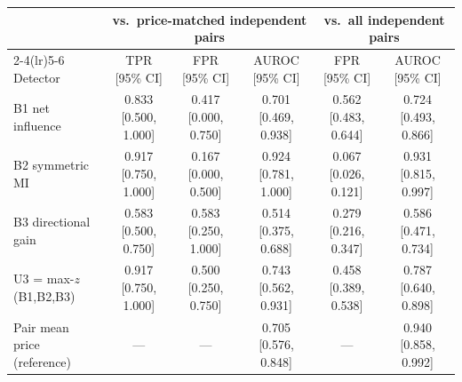 \begin{tabular}{lccccc}
\toprule
 & \multicolumn{3}{c}{vs.\ price-matched independent pairs} & \multicolumn{2}{c}{vs.\ all independent pairs} \\
\cmidrule(lr){2-4}\cmidrule(lr){5-6}
Detector & TPR [95\% CI] & FPR [95\% CI] & AUROC [95\% CI] & FPR [95\% CI] & AUROC [95\% CI] \\
\midrule
B1 net influence & 0.833 [0.500, 1.000] & 0.417 [0.000, 0.750] & 0.701 [0.469, 0.938] & 0.562 [0.483, 0.644] & 0.724 [0.493, 0.866] \\
B2 symmetric MI & 0.917 [0.750, 1.000] & 0.167 [0.000, 0.500] & 0.924 [0.781, 1.000] & 0.067 [0.026, 0.121] & 0.931 [0.815, 0.997] \\
B3 directional gain & 0.583 [0.500, 0.750] & 0.583 [0.250, 1.000] & 0.514 [0.375, 0.688] & 0.279 [0.216, 0.347] & 0.586 [0.471, 0.734] \\
U3 = max-$z$(B1,B2,B3) & 0.917 [0.750, 1.000] & 0.500 [0.250, 0.750] & 0.743 [0.562, 0.931] & 0.458 [0.389, 0.538] & 0.787 [0.640, 0.898] \\
Pair mean price (reference) & --- & --- & 0.705 [0.576, 0.848] & --- & 0.940 [0.858, 0.992] \\
\bottomrule
\end{tabular}
